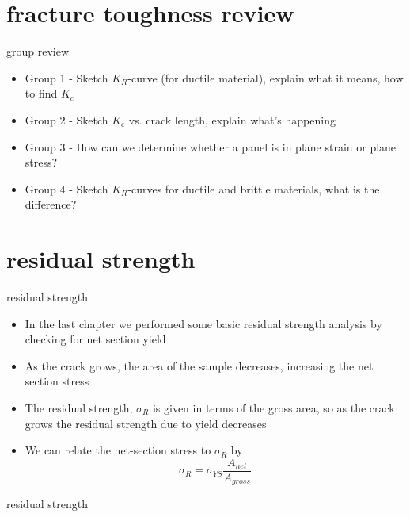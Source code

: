 \documentclass[10pt]{beamer}
\begin{document}
\section{fracture toughness review}

\begin{frame}{group review}
	\begin{itemize}
		\item Group 1 - Sketch $K_R$-curve (for ductile material), explain what it means, how to find $K_c$
		\item Group 2 - Sketch $K_c$ vs. crack length, explain what's happening
		\item Group 3 - How can we determine whether a panel is in plane strain or plane stress?
		\item Group 4 - Sketch $K_R$-curves for ductile and brittle materials, what is the difference?
	\end{itemize}
\end{frame}

\section{residual strength}

\begin{frame}{residual strength}
	\begin{itemize}[<+->]
		\item In the last chapter we performed some basic residual strength analysis by checking for net section yield
		\item As the crack grows, the area of the sample decreases, increasing the net section stress
		\item The residual strength, $\sigma_R$ is given in terms of the gross area, so as the crack grows the residual strength due to yield decreases
		\item We can relate the net-section stress to $\sigma_R$ by
		\begin{equation}
		\sigma_R = \sigma_{YS} \frac{A_{net}}{A_{gross}}
		\end{equation}
	\end{itemize}
\end{frame}

\begin{frame}{residual strength}
	\begin{figure}
	\end{figure}
\end{frame}
\end{document}
